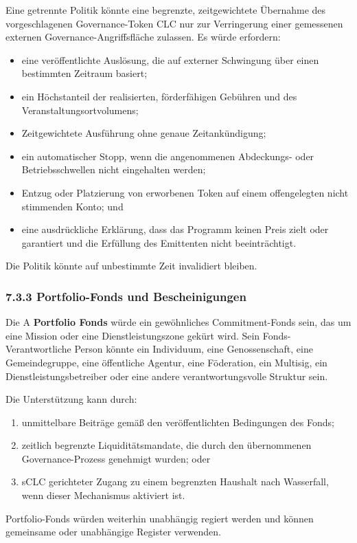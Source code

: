 \documentclass[11pt]{article}
\begin{document}
Eine getrennte Politik könnte eine begrenzte, zeitgewichtete Übernahme des vorgeschlagenen Governance-Token CLC nur zur Verringerung einer gemessenen externen Governance-Angriffsfläche zulassen. Es würde erfordern:

\begin{itemize}[leftmargin=*]
\item eine veröffentlichte Auslösung, die auf externer Schwingung über einen bestimmten Zeitraum basiert;
\item ein Höchstanteil der realisierten, förderfähigen Gebühren und des Veranstaltungsortvolumens;
\item Zeitgewichtete Ausführung ohne genaue Zeitankündigung;
\item ein automatischer Stopp, wenn die angenommenen Abdeckungs- oder Betriebsschwellen nicht eingehalten werden;
\item Entzug oder Platzierung von erworbenen Token auf einem offengelegten nicht stimmenden Konto; und
\item eine ausdrückliche Erklärung, dass das Programm keinen Preis zielt oder garantiert und die Erfüllung des Emittenten nicht beeinträchtigt.
\end{itemize}
Die Politik könnte auf unbestimmte Zeit invalidiert bleiben.

\subsubsection*{7.3.3 Portfolio-Fonds und Bescheinigungen}

Die A \textbf{Portfolio Fonds} würde ein gewöhnliches Commitment-Fonds sein, das um eine Mission oder eine Dienstleistungszone gekürt wird. Sein Fonds-Verantwortliche Person könnte ein Individuum, eine Genossenschaft, eine Gemeindegruppe, eine öffentliche Agentur, eine Föderation, ein Multisig, ein Dienstleistungsbetreiber oder eine andere verantwortungsvolle Struktur sein.

Die Unterstützung kann durch:

\begin{enumerate}[leftmargin=*]
\item unmittelbare Beiträge gemäß den veröffentlichten Bedingungen des Fonds;
\item zeitlich begrenzte Liquiditätsmandate, die durch den übernommenen Governance-Prozess genehmigt wurden; oder
\item sCLC gerichteter Zugang zu einem begrenzten Haushalt nach Wasserfall, wenn dieser Mechanismus aktiviert ist.
\end{enumerate}
Portfolio-Fonds würden weiterhin unabhängig regiert werden und können gemeinsame oder unabhängige Register verwenden.
\end{document}
